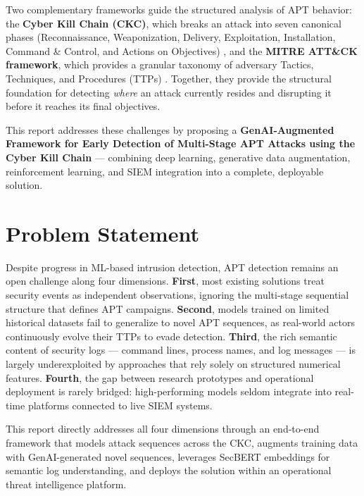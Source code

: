 \documentclass[11pt,a4paper]{report}
\begin{document}
Two complementary frameworks guide the structured analysis of APT behavior: the
\textbf{Cyber Kill Chain (CKC)}, which breaks an attack into seven canonical phases
(Reconnaissance, Weaponization, Delivery, Exploitation, Installation, Command \&
Control, and Actions on Objectives) , and the
\textbf{MITRE ATT\&CK framework}, which provides a granular taxonomy of adversary
Tactics, Techniques, and Procedures (TTPs) . Together, they
provide the structural foundation for detecting \textit{where} an attack currently resides
and disrupting it before it reaches its final objectives.

This report addresses these challenges by proposing a
\textbf{GenAI-Augmented Framework for Early Detection of Multi-Stage APT Attacks
using the Cyber Kill Chain} --- combining deep learning, generative data augmentation,
reinforcement learning, and SIEM integration into a complete, deployable solution.

\section*{Problem Statement}

Despite progress in ML-based intrusion detection, APT detection remains an open
challenge along four dimensions. \textbf{First}, most existing solutions treat security
events as independent observations, ignoring the multi-stage sequential structure that
defines APT campaigns. \textbf{Second}, models trained on limited historical datasets
fail to generalize to novel APT sequences, as real-world actors continuously evolve
their TTPs to evade detection. \textbf{Third}, the rich semantic content of security
logs --- command lines, process names, and log messages --- is largely underexploited
by approaches that rely solely on structured numerical features. \textbf{Fourth}, the gap
between research prototypes and operational deployment is rarely bridged: high-performing
models seldom integrate into real-time platforms connected to live SIEM systems.

This report directly addresses all four dimensions through an end-to-end framework that
models attack sequences across the CKC, augments training data with GenAI-generated
novel sequences, leverages SecBERT embeddings for semantic log understanding, and
deploys the solution within an operational threat intelligence platform.

\end{document}
